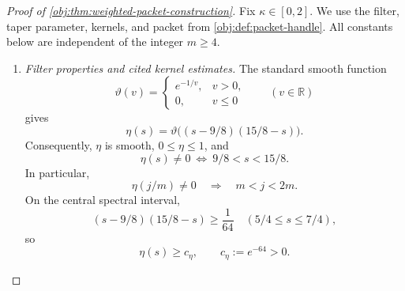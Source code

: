 \documentclass[11pt]{article}
\begin{document}
\begin{proof}[Proof of \cref{obj:thm:weighted-packet-construction}]
Fix \(\kappa\in[0,2]\). We use the filter, taper parameter, kernels, and packet from \cref{obj:def:packet-handle}. All constants below are independent of the integer \(m\ge4\).

\begin{enumerate}
\item \emph{Filter properties and cited kernel estimates.}
The standard smooth function
\[
\vartheta(v)=
\begin{cases}
e^{-1/v},&v>0,\\
0,&v\le0
\end{cases}
\qquad(v\in\mathbb R)
\]
gives
\[
\eta(s)=\vartheta\bigl((s-9/8)(15/8-s)\bigr).
\]
Consequently, \(\eta\) is smooth, \(0\le\eta\le1\), and
\[
\eta(s)\ne0\ \Longleftrightarrow\ 9/8<s<15/8.
\]
In particular,
\[
\eta(j/m)\ne0\quad\Longrightarrow\quad m<j<2m.
\]
On the central spectral interval,
\[
(s-9/8)(15/8-s)\ge\frac1{64}
\quad(5/4\le s\le7/4),
\]
so
\[
\eta(s)\ge c_\eta,\qquad c_\eta:=e^{-64}>0.
\]


\end{enumerate}
\end{proof}
\end{document}
